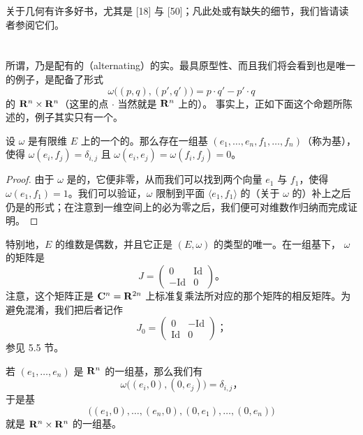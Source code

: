
关于\trSymplectic{}几何有许多好书，尤其是 [18] 与 [50]；凡此处或有缺失的细节，我们皆请读者参阅它们。

\section{\trSymplectic\trVectorSpace}
\label{sec:symplectic-vector-spaces}

所谓\trSymplectic\trVectorSpace，乃是配有\trNondegenerate{}的\textbf{\trAlternating}（alternating）\trBilinearForm{}的实\trVectorSpace。最具原型性、而且我们将会看到也是唯一的例子，是配备了形式
\[
\omega\bigl((p,q),(p',q')\bigr)=p\cdot q'-p'\cdot q
\]
的 $\mathbf{R}^n\times\mathbf{R}^n$（这里的点 $\cdot$ 当然就是 $\mathbf{R}^n$ 上的\trEuclidean\trInnerProduct）。
事实上，正如下面这个命题所陈述的，例子其实只有一个。

\begin{proposition}\label{thm:symplectic-basis-existence}
设 $\omega$ 是有限维\trVectorSpace{} $E$ 上的一个\trNondegenerate{}的\trAlternating\trBilinearForm。那么存在一组基 $(e_1,\dotsc,e_n,f_1,\dotsc,f_n)$（称为\trSymplectic{}基），使得 $\omega(e_i,f_j)=\delta_{i,j}$ 且 $\omega(e_i,e_j)=\omega(f_i,f_j)=0$。
\end{proposition}

\begin{proof}
由于 $\omega$ 是\trNondegenerate{}的，它便非零，从而我们可以找到两个向量 $e_1$ 与 $f_1$，使得 $\omega(e_1,f_1)=1$。我们可以验证，$\omega$ 限制到平面 $\langle e_1,f_1\rangle$ 的（关于 $\omega$ 的）\trOrthogonal{}补上之后仍是\trNondegenerate{}的形式；在注意到一维空间上的\trAlternating\trBilinearForm{}必为零之后，我们便可对维数作归纳而完成证明。
\end{proof}

特别地，$E$ 的维数是偶数，并且它正是 $(E,\omega)$ 的\trIsomorphism{}类型的唯一\trInvariant。在一组\trSymplectic{}基下，\trBilinearForm{} $\omega$ 的矩阵是
\[
J=\begin{pmatrix}
0 & \mathrm{Id}\\
-\mathrm{Id} & 0
\end{pmatrix}\text{。}
\]
注意，这个矩阵正是 $\mathbf{C}^n=\mathbf{R}^{2n}$ 上标准复乘法所对应的那个矩阵的相反矩阵。为避免混淆，我们把后者记作
\[
J_0=\begin{pmatrix}
0 & -\mathrm{Id}\\
\mathrm{Id} & 0
\end{pmatrix}\text{；}
\]
参见 5.5 节。

\begin{example}\label{thm:standard-symplectic-basis}
若 $(e_1,\dotsc,e_n)$ 是 $\mathbf{R}^n$ 的一组\trOrthonormal{}基，那么我们有
\[
\omega\bigl((e_i,0),(0,e_j)\bigr)=\delta_{i,j}\text{，}
\]
于是基
\[
\bigl((e_1,0),\dotsc,(e_n,0),(0,e_1),\dotsc,(0,e_n)\bigr)
\]
就是 $\mathbf{R}^n\times\mathbf{R}^n$ 的一组\trSymplectic{}基。
\end{example}
